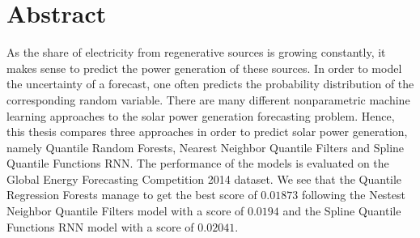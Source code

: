
\chapter*{Abstract}

\begin{center}
  \begin{minipage}{12cm}
    \begin{sloppypar}
      As the share of electricity from regenerative sources is growing constantly, 
      it makes sense to predict the power generation of these sources. 
      In order to model the uncertainty of a forecast, one often predicts the probability 
      distribution of the corresponding random variable. There are many different nonparametric machine learning approaches 
      to the solar power generation forecasting problem. Hence, this thesis compares three approaches 
      in order to predict solar power generation, namely Quantile Random Forests, Nearest Neighbor Quantile Filters and 
      Spline Quantile Functions RNN. The performance of the models is evaluated on the Global Energy Forecasting Competition 2014 
      dataset. 
      We see that the Quantile Regression Forests manage to get the best score of \(0.01873\) following 
      the Nestest Neighbor Quantile Filters model with a score of \(0.0194\) and the Spline Quantile Functions RNN model with a score of \(0.02041\). 
    \end{sloppypar}
  \end{minipage}
\end{center}